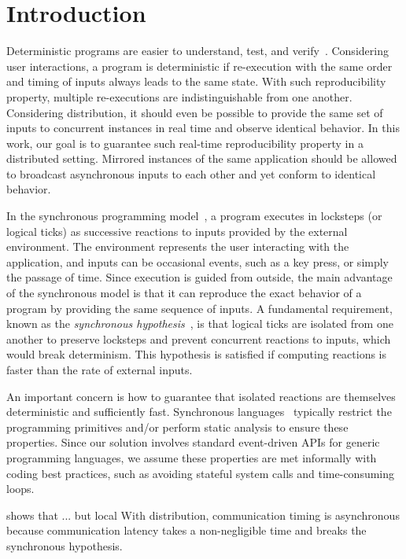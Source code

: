 \documentclass[sigplan,screen]{acmart}
\begin{document}
\section{Introduction}

Deterministic programs are easier to understand, test, and verify~\cite{det}.
Considering user interactions, a program is deterministic if re-execution with
the same order and timing of inputs always leads to the same state.
With such reproducibility property, multiple re-executions are
indistinguishable from one another.
Considering distribution, it should even be possible to provide the same set of
inputs to concurrent instances in real time and observe identical behavior.
In this work, our goal is to guarantee such real-time reproducibility property
in a distributed setting.
Mirrored instances of the same application should be allowed to broadcast
asynchronous inputs to each other and yet conform to identical behavior.

In the synchronous programming model~\cite{hipo}, a program executes in
locksteps (or logical ticks) as successive reactions to inputs provided by the
external environment.
The environment represents the user interacting with the application, and
inputs can be occasional events, such as a key press, or simply the passage of
time.
Since execution is guided from outside, the main advantage of the synchronous
model is that it can reproduce the exact behavior of a program by providing the
same sequence of inputs.
A fundamental requirement, known as the \emph{synchronous hypothesis}~\cite{hypo},
is that logical ticks are isolated from one another to preserve locksteps and
prevent concurrent reactions to inputs, which would break determinism.
This hypothesis is satisfied if computing reactions is faster than the rate of
external inputs.

An important concern is how to guarantee that isolated reactions are themselves
deterministic and sufficiently fast.
Synchronous languages~\cite{twelve} typically restrict the programming
primitives and/or perform static analysis to ensure these properties.
Since our solution involves standard event-driven APIs for generic programming
languages, we assume these properties are met informally with coding best
practices, such as avoiding stateful system calls and time-consuming loops.


  shows that ... but local
With distribution, communication timing is asynchronous because communication
latency takes a non-negligible time and breaks the synchronous hypothesis.
\end{document}
